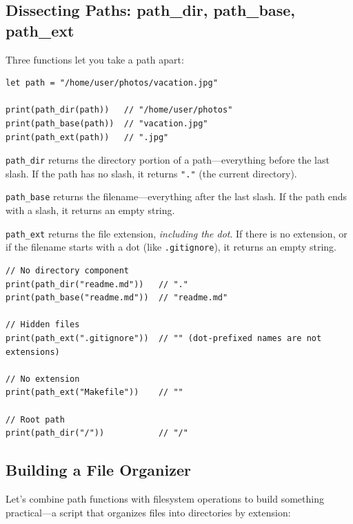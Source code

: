 \subsection{Dissecting Paths: path\_dir, path\_base, path\_ext}
\label{sec:path-dissect}

Three functions let you take a path apart:

\begin{lstlisting}[language=Lattice, caption={Dissecting a file path}]
let path = "/home/user/photos/vacation.jpg"

print(path_dir(path))   // "/home/user/photos"
print(path_base(path))  // "vacation.jpg"
print(path_ext(path))   // ".jpg"
\end{lstlisting}

\lstinline|path_dir| returns the directory portion of a path---everything
before the last slash. If the path has no slash, it returns \lstinline|"."|
(the current directory).

\lstinline|path_base| returns the filename---everything after the last
slash. If the path ends with a slash, it returns an empty string.

\lstinline|path_ext| returns the file extension, \emph{including the dot}. If
there is no extension, or if the filename starts with a dot (like
\texttt{.gitignore}), it returns an empty string.

\begin{lstlisting}[language=Lattice, caption={Edge cases in path functions}]
// No directory component
print(path_dir("readme.md"))   // "."
print(path_base("readme.md"))  // "readme.md"

// Hidden files
print(path_ext(".gitignore"))  // "" (dot-prefixed names are not extensions)

// No extension
print(path_ext("Makefile"))    // ""

// Root path
print(path_dir("/"))           // "/"
\end{lstlisting}

\subsection{Building a File Organizer}\label{sec:file-organizer}

Let's combine path functions with filesystem operations to build something
practical---a script that organizes files into directories by extension:

